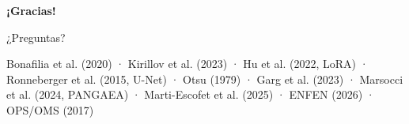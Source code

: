 \documentclass[10pt,aspectratio=1610]{beamer}
\begin{document}
\begin{frame}
  \centering
  \vfill
  {\Huge\color{blue!60!black}\textbf{¡Gracias!}}\par
  \vspace{4mm}
  {\Large ¿Preguntas?}\par
  \vfill
  {\scriptsize Bonafilia et al. (2020) · Kirillov et al. (2023) · Hu et al. (2022, LoRA) · Ronneberger et al. (2015, U-Net) · Otsu (1979) · Garg et al. (2023) · Marsocci et al. (2024, PANGAEA) · Marti-Escofet et al. (2025) · ENFEN (2026) · OPS/OMS (2017)}
  \vfill
\end{frame}
\end{document}
